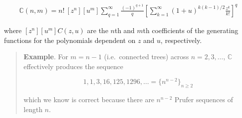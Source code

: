 \documentclass[
]{article}
\begin{document}
\[
\begin{align*}
    \mathbb{C}(n, m) = n! ~ [ z^n ][ u^m ] \sum_{q=1}^{\infty} \frac{ (-1)^{q+1} }{q} \left[ \sum_{k=1}^{\infty}\left( 1+u \right)^{k (k-1) / 2} \frac{z^k}{k!}  \right]^{q} 
\end{align*}
\]

where \([z^n][u^m]C(z, u)\) are the \(n\)th and \(m\)th coefficients of
the generating functions for the polynomials dependent on \(z\) and
\(u\), respectively.

\begin{quote}
\textbf{Example}. For \(m = n - 1\) (i.e.~connected trees) across
\(n = 2, 3, \ldots\), \(\mathbb{C}\) effectively produces the sequence

\[    1, 1, 3, 16, 125, 1296, \ldots  = \{n^{n-2}\}_{n\geq2 }\]

which we know is correct because there are \(n^{n-2}\) Prufer sequences
of length \(n\).
\end{quote}
\end{document}
